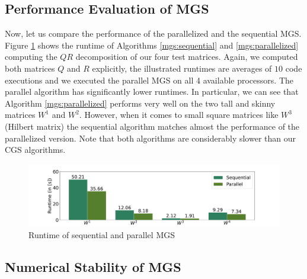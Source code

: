 \documentclass{article}
\begin{document}
\subsection{Performance Evaluation of MGS}

Now, let us compare the performance of the parallelized and the sequential MGS.
Figure \ref{fig:performanceMGS} shows the runtime of Algorithms
\ref{mgs:sequential} and \ref{mgs:parallelized} computing the $QR$ decomposition
of our four test matrices. Again, we computed both matrices $Q$ and $R$
explicitly, the illustrated runtimes are averages of $10$ code executions and we
executed the parallel MGS on all 4 available processors. The parallel algorithm
has significantly lower runtimes. In particular, we can see that Algorithm
\ref{mgs:parallelized} performs very well on the two tall and skinny matrices
$W^1$ and $W^2$. However, when it comes to small square matrices like $W^3$
(Hilbert matrix) the sequential algorithm matches almost the performance of the
parallelized version. Note that both algorithms are considerably slower than our
CGS algorithms.
\begin{figure}[t]
    \centering
    \includegraphics[width=\textwidth, trim = 0cm 1.5cm 0cm 1.25cm]{./plots/MGS_Performance.pdf}
    \caption{Runtime of sequential and parallel MGS} \label{fig:performanceMGS}
\end{figure}

\subsection{Numerical Stability of MGS}
\end{document}
